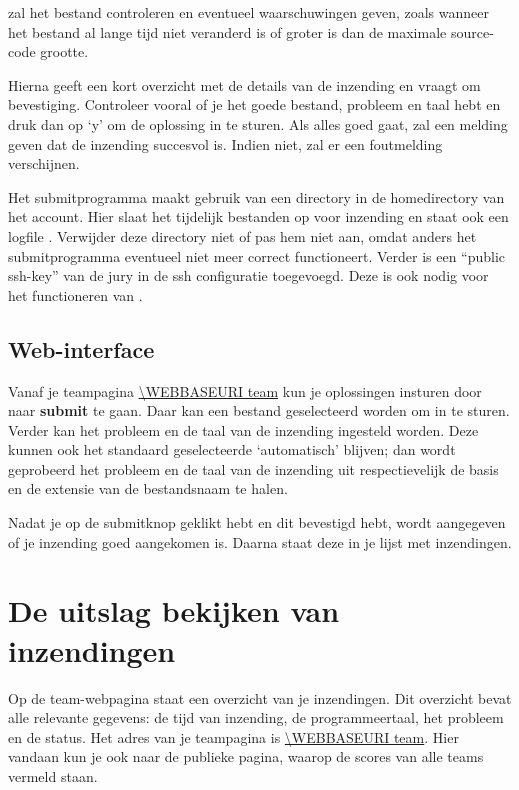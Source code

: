  zal het bestand controleren en eventueel
waarschuwingen geven, zoals wanneer het bestand al lange tijd niet
veranderd is of groter is dan de maximale source-code grootte.

Hierna geeft  een kort overzicht met de details van de
inzending en vraagt om bevestiging. Controleer vooral of je het goede
bestand, probleem en taal hebt en druk dan op `y' om de oplossing in
te sturen. Als alles goed gaat, zal  een melding geven
dat de inzending succesvol is. Indien niet, zal er een foutmelding
verschijnen.

Het submitprogramma maakt gebruik van een directory \cmd{\USERSUBMITDIR}
in de homedirectory van het account. Hier slaat het tijdelijk
bestanden op voor inzending en staat ook een logfile .
Verwijder deze directory niet of pas hem niet aan, omdat anders het
submitprogramma eventueel niet meer correct functioneert. Verder
is een ``public ssh-key'' van de jury in de ssh configuratie
toegevoegd. Deze is ook nodig voor het functioneren van .

\subsection{Web-interface}

Vanaf je teampagina \url{\WEBBASEURI team} kun je oplossingen insturen
door naar \textbf{submit} te gaan. Daar kan een bestand
geselecteerd worden om in te sturen. Verder kan het probleem en de
taal van de inzending ingesteld worden. Deze kunnen ook het
standaard geselecteerde `automatisch' blijven; dan wordt
geprobeerd het probleem en de taal van de inzending uit
respectievelijk de basis en de extensie van de bestandsnaam te halen.

Nadat je op de submitknop geklikt hebt en dit bevestigd hebt, wordt
aangegeven of je inzending goed aangekomen is. Daarna staat deze in je
lijst met inzendingen.

\section{De uitslag bekijken van inzendingen}

Op de team-webpagina staat een overzicht van je inzendingen.
Dit overzicht bevat alle relevante gegevens: de tijd van inzending, de
programmeertaal, het probleem en de status. Het adres van je
teampagina is \url{\WEBBASEURI team}. Hier vandaan kun je ook naar
de publieke pagina, waarop de scores van alle teams vermeld staan.


